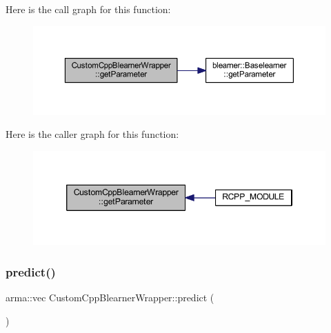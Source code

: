 Here is the call graph for this function\+:\nopagebreak
\begin{figure}[H]
\begin{center}
\leavevmode
\includegraphics[width=350pt]{class_custom_cpp_blearner_wrapper_a604cbaa8f8fe0bc5fda3a9baad13f646_cgraph}
\end{center}
\end{figure}
Here is the caller graph for this function\+:\nopagebreak
\begin{figure}[H]
\begin{center}
\leavevmode
\includegraphics[width=346pt]{class_custom_cpp_blearner_wrapper_a604cbaa8f8fe0bc5fda3a9baad13f646_icgraph}
\end{center}
\end{figure}
\mbox{\label{class_custom_cpp_blearner_wrapper_adc2c36f510b88052f2fd599b3e737ee2}} 
\subsubsection{\texorpdfstring{predict()}{predict()}}
{\footnotesize\ttfamily arma\+::vec Custom\+Cpp\+Blearner\+Wrapper\+::predict (\begin{DoxyParamCaption}{ }\end{DoxyParamCaption})\hspace{0.3cm}{\ttfamily [inline]}}

